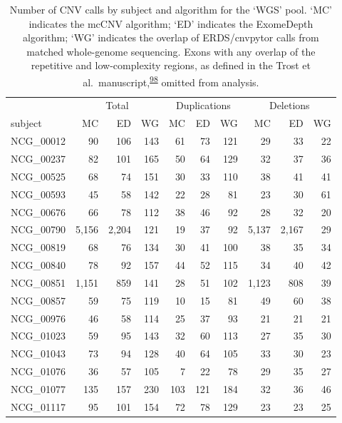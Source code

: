 \documentclass[11pt,letterpaper,oneside]{book}
\begin{document}
\begin{table}

\caption[Number of CNV calls by subject and algorithm for the `WGS' pool.]{\label{tab:wgsCallSbj}Number of CNV calls by subject and algorithm for the `WGS' pool. `MC' indicates the mcCNV algorithm; `ED' indicates the ExomeDepth algorithm; `WG' indicates the overlap of ERDS/cnvpytor calls from matched whole-genome sequencing. Exons with any overlap of the repetitive and low-complexity regions, as defined in the Trost et al.~manuscript,\textsuperscript{\protect\hyperlink{ref-trost:2018aa}{98}} omitted from analysis.}
\centering
\begin{tabular}[t]{lrrrrrrrrr}
\toprule
\multicolumn{1}{c}{ } & \multicolumn{3}{c}{Total} & \multicolumn{3}{c}{Duplications} & \multicolumn{3}{c}{Deletions} \\
\cmidrule(l{3pt}r{3pt}){2-4} \cmidrule(l{3pt}r{3pt}){5-7} \cmidrule(l{3pt}r{3pt}){8-10}
subject & MC & ED & WG & MC & ED & WG & MC & ED & WG\\
\midrule
NCG\_00012 & 90 & 106 & 143 & 61 & 73 & 121 & 29 & 33 & 22\\
NCG\_00237 & 82 & 101 & 165 & 50 & 64 & 129 & 32 & 37 & 36\\
NCG\_00525 & 68 & 74 & 151 & 30 & 33 & 110 & 38 & 41 & 41\\
NCG\_00593 & 45 & 58 & 142 & 22 & 28 & 81 & 23 & 30 & 61\\
NCG\_00676 & 66 & 78 & 112 & 38 & 46 & 92 & 28 & 32 & 20\\
\addlinespace
NCG\_00790 & 5,156 & 2,204 & 121 & 19 & 37 & 92 & 5,137 & 2,167 & 29\\
NCG\_00819 & 68 & 76 & 134 & 30 & 41 & 100 & 38 & 35 & 34\\
NCG\_00840 & 78 & 92 & 157 & 44 & 52 & 115 & 34 & 40 & 42\\
NCG\_00851 & 1,151 & 859 & 141 & 28 & 51 & 102 & 1,123 & 808 & 39\\
NCG\_00857 & 59 & 75 & 119 & 10 & 15 & 81 & 49 & 60 & 38\\
\addlinespace
NCG\_00976 & 46 & 58 & 114 & 25 & 37 & 93 & 21 & 21 & 21\\
NCG\_01023 & 59 & 95 & 143 & 32 & 60 & 113 & 27 & 35 & 30\\
NCG\_01043 & 73 & 94 & 128 & 40 & 64 & 105 & 33 & 30 & 23\\
NCG\_01076 & 36 & 57 & 105 & 7 & 22 & 78 & 29 & 35 & 27\\
NCG\_01077 & 135 & 157 & 230 & 103 & 121 & 184 & 32 & 36 & 46\\
\addlinespace
NCG\_01117 & 95 & 101 & 154 & 72 & 78 & 129 & 23 & 23 & 25\\
\bottomrule
\end{tabular}
\end{table}
\end{document}
